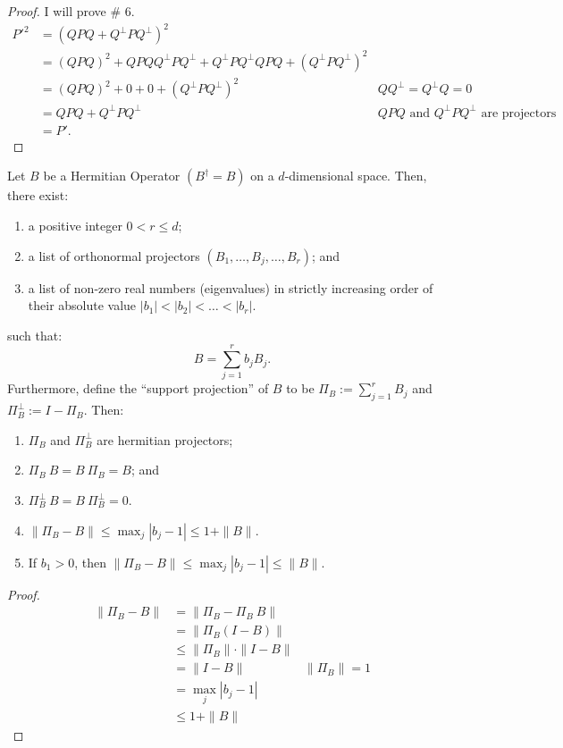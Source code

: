 \begin{proof}
    I will prove \# 6.
    \begin{align*}
        P'^2 &= \left(QPQ + Q^\bot P Q^\bot\right)^2\\
        &= (QPQ)^2 + QPQ Q^\bot P Q^\bot + Q^\bot P Q^\bot QPQ + \left(Q^\bot P Q^\bot\right)^2\\
        &= (QPQ)^2 + 0 + 0 + \left(Q^\bot P Q^\bot\right)^2 & QQ^\bot = Q^\bot Q = 0\\
        &= QPQ + Q^\bot P Q^\bot & QPQ \text{ and } Q^\bot P Q^\bot \text{ are projectors}\\
        &= P'.
    \end{align*}
\end{proof}

\begin{fact}
    Let $B$ be a Hermitian Operator $(B^\dagger = B)$ on a $d$-dimensional space. Then, there exist:
\begin{enumerate}
    \item a positive integer $0 < r \leq d$;
    \item a list of orthonormal projectors $\left(B_1, \dots, B_j, \dots, B_{r}\right)$; and 
    \item a list of non-zero real numbers (eigenvalues) in strictly increasing order of their absolute value $|b_1| < |b_2| <\dots < |b_r|$.
\end{enumerate}
 such that:
\begin{equation}
    B = \sum\limits_{j = 1}^{r} b_j B_j.
\end{equation}
Furthermore, define the ``support projection'' of $B$ to be $\Pi_B := \sum\limits_{j = 1}^r B_j$ and $\Pi_B^\bot := I - \Pi_B$. Then:
\begin{enumerate}
    \item $\Pi_B$ and $\Pi_B^\bot$ are hermitian projectors;
    \item $\Pi_B\ B = B\ \Pi_B = B$; and
    \item $\Pi_B^\bot\ B = B \ \Pi_B^\bot = 0$.
    \item $\|\Pi_B - B \| \leq \max_{j} | b_j - 1|\leq 1 + \| B \|$.
    \item If $b_1 > 0$, then $\|\Pi_B - B \| \leq \max_{j} |b_j - 1|\leq \| B \|$.
\end{enumerate}
\end{fact}
\begin{proof}
    \begin{align*}
        \|\Pi_B - B \| &= \|\Pi_B - \Pi_B\ B \| \\
        &= \|\Pi_B \left(I - B\right)\|\\
        &\leq \|\Pi_B\| \cdot \|I - B\|\\
        &= \|I - B\| & \|\Pi_B\| = 1\\
        &= \max_{j} |b_j - 1|\\
        &\leq 1 + \|B\|
    \end{align*}
\end{proof}



